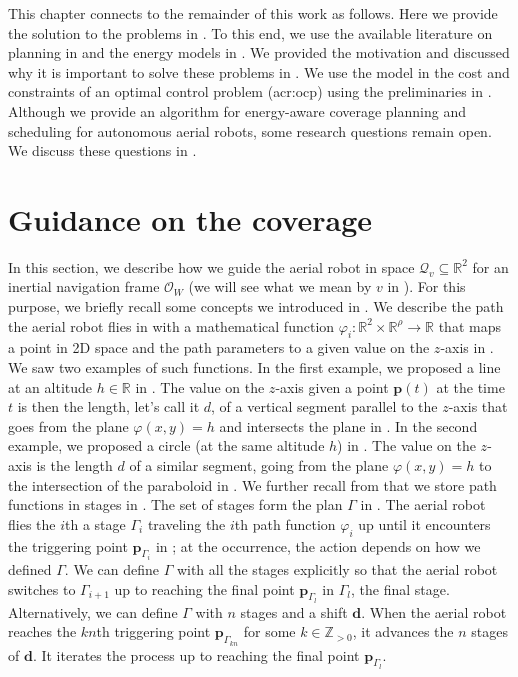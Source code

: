 This chapter connects to the remainder of this work as follows. Here we provide the solution to the problems in . To this end, we use the available literature on planning in  and the energy models in . We provided the motivation and discussed why it is important to solve these problems in . We use the model in the cost and constraints of an optimal control problem (\Gls{acr:ocp}) using the preliminaries in . Although we provide an algorithm for energy-aware coverage planning and scheduling for autonomous aerial robots, some research questions remain open. We discuss these questions in .


\section{Guidance on the coverage}\label{sec:gvf}

In this section, we describe how we guide the aerial robot in space $\mathcal{Q}_v\subseteq\mathbb{R}^2$ for an inertial navigation frame $\mathcal{O}_W$ (we will see what we mean by $v$ in ). For this purpose, we briefly recall some concepts we introduced in . We describe the path the aerial robot flies in  with a mathematical function $\varphi_i:\mathbb{R}^2\times\mathbb{R}^\rho\rightarrow\mathbb{R}$ that maps a point in 2D space and the path parameters to a given value on the $z$-axis in . We saw two examples of such functions. In the first example, we proposed a line at an altitude $h\in\mathbb{R}$ in . The value on the $z$-axis given a point $\mathbf{p}(t)$ at the time $t$ is then the length, let's call it $d$, of a vertical segment parallel to the $z$-axis that goes from the plane $\varphi(x,y)=h$ and intersects the plane in . In the second example, we proposed a circle (at the same altitude $h$) in . The value on the $z$-axis is the length $d$ of a similar segment, going from the plane $\varphi(x,y)=h$ to the intersection of the paraboloid in . We further recall from  that we store path functions in stages in . The set of stages form the plan $\Gamma$ in . The aerial robot flies the $i$th a stage $\Gamma_i$ traveling the $i$th path function $\varphi_i$ up until it encounters the triggering point $\mathbf{p}_{\Gamma_i}$ in ; at the occurrence, the action depends on how we defined $\Gamma$. We can define $\Gamma$ with all the stages explicitly so that the aerial robot switches to $\Gamma_{i+1}$ up to reaching the final point $\mathbf{p}_{\Gamma_l}$ in $\Gamma_l$, the final stage. Alternatively, we can define $\Gamma$ with $n$ stages and a shift $\mathbf{d}$. When the aerial robot reaches the $kn$th triggering point $\mathbf{p}_{\Gamma_{kn}}$ for some $k\in\mathbb{Z}_{>0}$, it advances the $n$ stages of $\mathbf{d}$. It iterates the process up to reaching the final point $\mathbf{p}_{\Gamma_l}$.

